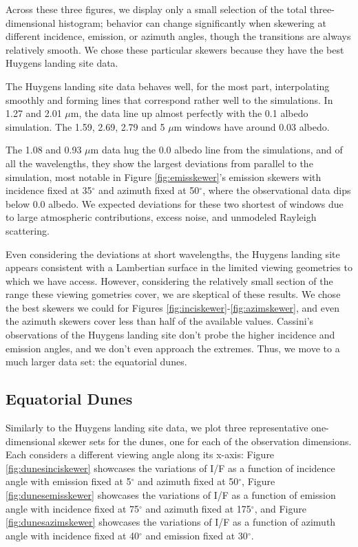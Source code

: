 \documentclass[twocolumn,linenumbers]{aastex631}
\begin{document}
Across these three figures, we display only a small selection of the total three-dimensional histogram; behavior can change significantly when skewering at different incidence, emission, or azimuth angles, though the transitions are always relatively smooth. We chose these particular skewers because they have the best Huygens landing site data.

The Huygens landing site data behaves well, for the most part, interpolating smoothly and forming lines that correspond rather well to the simulations. In 1.27 and 2.01 $\mu$m, the data line up almost perfectly with the 0.1 albedo simulation. The 1.59, 2.69, 2.79 and 5 $\mu$m windows have around 0.03 albedo.

The 1.08 and 0.93 $\mu$m data hug the 0.0 albedo line from the simulations, and of all the wavelengths, they show the largest deviations from parallel to the simulation, most notable in Figure \ref{fig:emisskewer}'s emission skewers with incidence fixed at 35$^{\circ}$ and azimuth fixed at 50$^{\circ}$, where the observational data dips below 0.0 albedo. We expected deviations for these two shortest of windows due to large atmospheric contributions, excess noise, and unmodeled Rayleigh scattering.

Even considering the deviations at short wavelengths, the Huygens landing site appears consistent with a Lambertian surface in the limited viewing geometries to which we have access. However, considering the relatively small section of the range these viewing gometries cover, we are skeptical of these results. We chose the best skewers we could for Figures \ref{fig:inciskewer}-\ref{fig:azimskewer}, and even the azimuth skewers cover less than half of the available values. Cassini's observations of the Huygens landing site don't probe the higher incidence and emission angles, and we don't even approach the extremes. Thus, we move to a much larger data set: the equatorial dunes.

\subsection{Equatorial Dunes} \label{sec:dunesC}

Similarly to the Huygens landing site data, we plot three representative one-dimensional skewer sets for the dunes, one for each of the observation dimensions. Each considers a different viewing angle along its x-axis: Figure \ref{fig:dunesinciskewer} showcases the variations of I/F as a function of incidence angle with emission fixed at 5$^{\circ}$ and azimuth fixed at 50$^{\circ}$, Figure \ref{fig:dunesemisskewer} showcases the variations of I/F as a function of emission angle with incidence fixed at 75$^{\circ}$ and azimuth fixed at 175$^{\circ}$, and Figure \ref{fig:dunesazimskewer} showcases the variations of I/F as a function of azimuth angle with incidence fixed at 40$^{\circ}$ and emission fixed at 30$^{\circ}$.
\end{document}
